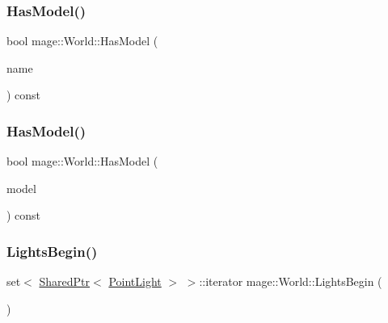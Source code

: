 \hypertarget{classmage_1_1_world_a381e0a56fc1ba6d0955a248f7b0f0c22}{}\label{classmage_1_1_world_a381e0a56fc1ba6d0955a248f7b0f0c22} 
\subsubsection{\texorpdfstring{Has\+Model()}{HasModel()}\hspace{0.1cm}{\footnotesize\ttfamily [1/2]}}
{\footnotesize\ttfamily bool mage\+::\+World\+::\+Has\+Model (\begin{DoxyParamCaption}\item[{const string \&}]{name }\end{DoxyParamCaption}) const}

\hypertarget{classmage_1_1_world_a821d420241b2a94502b20e24595490df}{}\label{classmage_1_1_world_a821d420241b2a94502b20e24595490df} 
\subsubsection{\texorpdfstring{Has\+Model()}{HasModel()}\hspace{0.1cm}{\footnotesize\ttfamily [2/2]}}
{\footnotesize\ttfamily bool mage\+::\+World\+::\+Has\+Model (\begin{DoxyParamCaption}\item[{const \hyperlink{namespacemage_a1e01ae66713838a7a67d30e44c67703e}{Shared\+Ptr}$<$ \hyperlink{classmage_1_1_model}{Model} $>$}]{model }\end{DoxyParamCaption}) const}

\hypertarget{classmage_1_1_world_a48964d5262a080dd866e612d7daa6bf2}{}\label{classmage_1_1_world_a48964d5262a080dd866e612d7daa6bf2} 
\subsubsection{\texorpdfstring{Lights\+Begin()}{LightsBegin()}\hspace{0.1cm}{\footnotesize\ttfamily [1/2]}}
{\footnotesize\ttfamily set$<$ \hyperlink{namespacemage_a1e01ae66713838a7a67d30e44c67703e}{Shared\+Ptr}$<$ \hyperlink{classmage_1_1_point_light}{Point\+Light} $>$ $>$\+::iterator mage\+::\+World\+::\+Lights\+Begin (\begin{DoxyParamCaption}{ }\end{DoxyParamCaption})}

